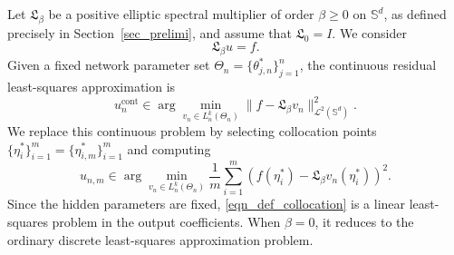 \documentclass{article}
\numberwithin{equation}{section}
\begin{document}
Let $\mathfrak L_\beta$ be a positive elliptic spectral multiplier of order $\beta\geq0$ on $\mathbb S^d$, as defined precisely in Section~\ref{sec_prelimi}, and assume that $\mathfrak L_0=I$. We consider
\begin{equation}\label{eqn:model_equation}
\mathfrak L_\beta u=f.
\end{equation}
Given a fixed network parameter set $\Theta_n=\{\theta_{j,n}^*\}_{j=1}^n$, the continuous residual least-squares approximation is
\begin{equation}
u_n^{\mathrm{cont}}\in\arg\min_{v_n\in L_n^k(\Theta_n)}\|f-\mathfrak L_\beta v_n\|_{\mathcal L^2(\mathbb S^d)}^2.
\end{equation}
We replace this continuous problem by selecting collocation points $\{\eta_i^*\}_{i=1}^m=\{\eta_{i,m}^*\}_{i=1}^{m}$ and computing
\begin{equation}\label{eqn_def_collocation}
u_{n,m}\in\arg\min_{v_n\in L_n^k(\Theta_n)}\frac1m\sum_{i=1}^m\left(f(\eta_i^*)-\mathfrak L_\beta v_n(\eta_i^*)\right)^2.
\end{equation}
Since the hidden parameters are fixed, \eqref{eqn_def_collocation} is a linear least-squares problem in the output coefficients. When $\beta=0$, it reduces to the ordinary discrete least-squares approximation problem.
\end{document}
